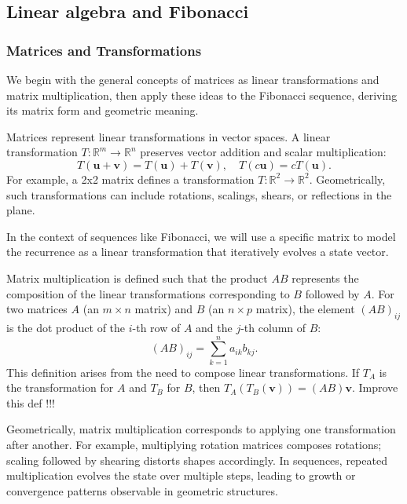 \documentclass{article}
\begin{document}
\subsection{Linear algebra and Fibonacci}
\subsubsection{Matrices and Transformations}
We begin with the general concepts of matrices as linear transformations and matrix multiplication, then apply these ideas to the Fibonacci sequence, deriving its matrix form and geometric meaning.

Matrices represent linear transformations in vector spaces. A linear transformation \( T: \mathbb{R}^m \to \mathbb{R}^n \) preserves vector addition and scalar multiplication:
\[
T(\mathbf{u} + \mathbf{v}) = T(\mathbf{u}) + T(\mathbf{v}), \quad T(c \mathbf{u}) = c T(\mathbf{u}).
\]
For example, a 2x2 matrix defines a transformation \( T: \mathbb{R}^2 \to \mathbb{R}^2 \). Geometrically, such transformations can include rotations, scalings, shears, or reflections in the plane.

In the context of sequences like Fibonacci, we will use a specific matrix to model the recurrence as a linear transformation that iteratively evolves a state vector.

Matrix multiplication is defined such that the product \( AB \) represents the composition of the linear transformations corresponding to \( B \) followed by \( A \). For two matrices \( A \) (an \( m \times n \) matrix) and \( B \) (an \( n \times p \) matrix), the element \( (AB)_{ij} \) is the dot product of the \( i \)-th row of \( A \) and the \( j \)-th column of \( B \):
\[
(AB)_{ij} = \sum_{k=1}^n a_{ik} b_{kj}.
\]
This definition arises from the need to compose linear transformations. If \( T_A \) is the transformation for \( A \) and \( T_B \) for \( B \), then \( T_A(T_B(\mathbf{v})) = (AB) \mathbf{v} \).
Improve this def !!!

Geometrically, matrix multiplication corresponds to applying one transformation after another. For example, multiplying rotation matrices composes rotations; scaling followed by shearing distorts shapes accordingly. In sequences, repeated multiplication evolves the state over multiple steps, leading to growth or convergence patterns observable in geometric structures.
\end{document}
